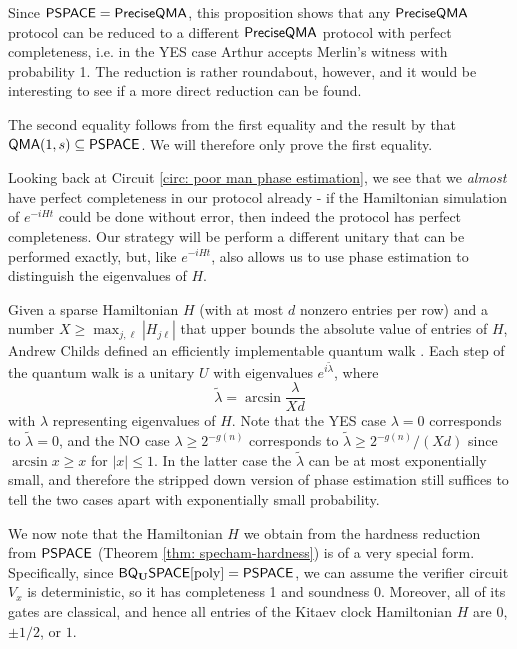 \documentclass[11pt]{article}
\theoremstyle{definition}
\theoremstyle{remark}
\newcommand\QMA{{\sf{QMA}}}
\newcommand\PSPACE{{\sf{PSPACE}}}
\newcommand\QMAexp{{\sf{PreciseQMA}}}
\newcommand{\classfont}{\sf}
\newcommand{\Unitary}{\mathbf{U}}
\newcommand{\unitaryBQSPACE}[1]{{\classfont{BQ}_\Unitary\classfont{SPACE}}[#1]}
\DeclareMathOperator{\poly}{poly}
\begin{document}
Since $\PSPACE = \QMAexp$, this proposition shows that any $\QMAexp$ protocol can be reduced to a different $\QMAexp$ protocol with perfect completeness, i.e. in the YES case Arthur accepts Merlin's witness with probability 1. The reduction is rather roundabout, however, and it would be interesting to see if a more direct reduction can be found.

The second equality follows from the first equality and the result by \cite{ikw12} that $\QMA(1,s) \subseteq \PSPACE$. We will therefore only prove the first equality.

Looking back at Circuit \ref{circ: poor man phase estimation}, we see that we \emph{almost} have perfect completeness in our protocol already - if the Hamiltonian simulation of $e^{-iHt}$ could be done without error, then indeed the protocol has perfect completeness. Our strategy will be perform a different unitary that can be performed exactly, but, like $e^{-iHt}$, also allows us to use phase estimation to distinguish the eigenvalues of $H$.

Given a sparse Hamiltonian $H$ (with at most $d$ nonzero entries per row) and a number $X \ge \max_{j,\ell}|H_{j\ell}|$ that upper bounds the absolute value of entries of $H$, Andrew Childs defined an efficiently implementable quantum walk \cite{berry14,childs10}. Each step of the quantum walk is a unitary $U$ with eigenvalues $e^{i\tilde{\lambda}}$, where 
\begin{equation}
\tilde{\lambda} = \arcsin \frac{\lambda}{Xd}
\end{equation}
with $\lambda$ representing eigenvalues of $H$. Note that the YES case $\lambda = 0$ corresponds to $\tilde{\lambda}=0$, and the NO case $\lambda \ge 2^{-g(n)}$ corresponds to $\tilde{\lambda} \ge 2^{-g(n)}/(Xd)$ since $\arcsin x \ge x$ for $|x| \le 1$. In the latter case the $\tilde{\lambda}$ can be at most exponentially small, and therefore the stripped down version of phase estimation still suffices to tell the two cases apart with exponentially small probability.

We now note that the Hamiltonian $H$ we obtain from the hardness reduction from $\PSPACE$ (Theorem \ref{thm: specham-hardness}) is of a very special form. Specifically, since $\unitaryBQSPACE{\poly}=\PSPACE$, we can assume the verifier circuit $V_x$ is deterministic, so it has completeness 1 and soundness 0. Moreover, all of its gates are classical, and hence all entries of the Kitaev clock Hamiltonian $H$ are $0$, $\pm 1/2$, or $1$.
\end{document}
